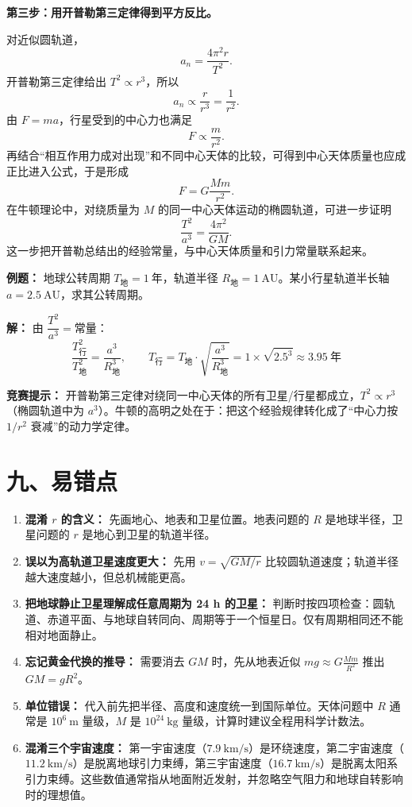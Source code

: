 \begin{competitionbox}
\textbf{第三步：用开普勒第三定律得到平方反比。}

对近似圆轨道，
\[
a_n=\frac{4\pi^2r}{T^2}.
\]
开普勒第三定律给出 $T^2\propto r^3$，所以
\[
a_n\propto \frac{r}{r^3}=\frac{1}{r^2}.
\]
由 $F=ma$，行星受到的中心力也满足
\[
F\propto \frac{m}{r^2}.
\]
再结合“相互作用力成对出现”和不同中心天体的比较，可得到中心天体质量也应成正比进入公式，于是形成
\[
\boxed{F=G\frac{Mm}{r^2}}.
\]
在牛顿理论中，对绕质量为 $M$ 的同一中心天体运动的椭圆轨道，可进一步证明
\[
\boxed{\frac{T^2}{a^3}=\frac{4\pi^2}{GM}}.
\]
这一步把开普勒总结出的经验常量，与中心天体质量和引力常量联系起来。

\textbf{例题：} 地球公转周期 $T_{\text{地}} = 1\ \text{年}$，轨道半径 $R_{\text{地}} = 1\ \text{AU}$。某小行星轨道半长轴 $a = 2.5\ \text{AU}$，求其公转周期。

\textbf{解：} 由 $\dfrac{T^2}{a^3} = \text{常量}$：
\[
\frac{T_{\text{行}}^2}{T_{\text{地}}^2} = \frac{a^3}{R_{\text{地}}^3},\qquad
T_{\text{行}} = T_{\text{地}} \cdot \sqrt{\frac{a^3}{R_{\text{地}}^3}} = 1 \times \sqrt{2.5^3} \approx 3.95\ \text{年}
\]

\textbf{竞赛提示：} 开普勒第三定律对绕同一中心天体的所有卫星/行星都成立，$T^2 \propto r^3$（椭圆轨道中为 $a^3$）。牛顿的高明之处在于：把这个经验规律转化成了“中心力按 $1/r^2$ 衰减”的动力学定律。
\end{competitionbox}

\section*{九、易错点}

\begin{mistakebox}
\small
\begin{enumerate}[nosep]
  \item \textbf{混淆 $r$ 的含义：} 先画地心、地表和卫星位置。地表问题的 $R$ 是地球半径，卫星问题的 $r$ 是地心到卫星的轨道半径。

  \item \textbf{误以为高轨道卫星速度更大：} 先用 $v=\sqrt{GM/r}$ 比较圆轨道速度；轨道半径越大速度越小，但总机械能更高。

  \item \textbf{把地球静止卫星理解成任意周期为 24 h 的卫星：} 判断时按四项检查：圆轨道、赤道平面、与地球自转同向、周期等于一个恒星日。仅有周期相同还不能相对地面静止。

  \item \textbf{忘记黄金代换的推导：} 需要消去 $GM$ 时，先从地表近似 $mg \approx G\frac{Mm}{R^2}$ 推出 $GM=gR^2$。

  \item \textbf{单位错误：} 代入前先把半径、高度和速度统一到国际单位。天体问题中 $R$ 通常是 $10^6\ \mathrm{m}$ 量级，$M$ 是 $10^{24}\ \mathrm{kg}$ 量级，计算时建议全程用科学计数法。

  \item \textbf{混淆三个宇宙速度：} 第一宇宙速度（$7.9\ \mathrm{km/s}$）是环绕速度，第二宇宙速度（$11.2\ \mathrm{km/s}$）是脱离地球引力束缚，第三宇宙速度（$16.7\ \mathrm{km/s}$）是脱离太阳系引力束缚。这些数值通常指从地面附近发射，并忽略空气阻力和地球自转影响时的理想值。
\end{enumerate}
\end{mistakebox}

